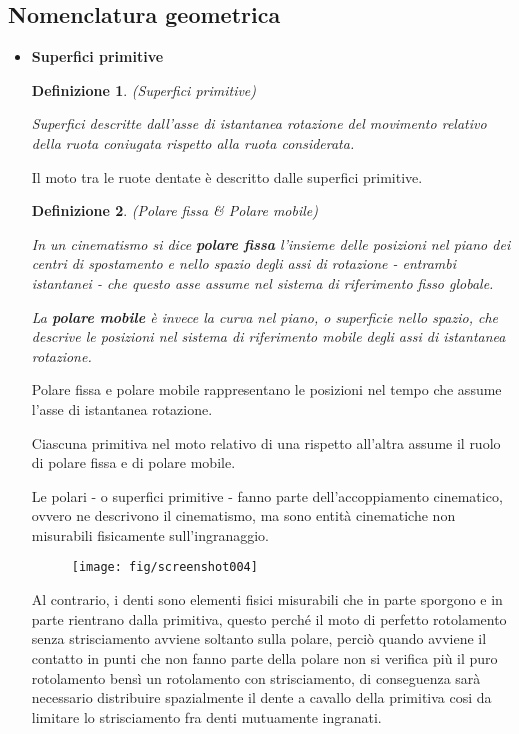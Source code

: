 \documentclass[a4paper, 15pt]{article}
\newtheorem*{deff}{Definizione}
\begin{document}
\subsection{Nomenclatura geometrica} 
\begin{adjustwidth}{2in}{}
	\begin{itemize}
		\item \textbf{Superfici primitive}
		
		\begin{deff} (Superfici primitive)
			
			Superfici descritte dall’asse di istantanea rotazione del movimento relativo della ruota coniugata rispetto alla ruota considerata.
		\end{deff} 
		Il moto tra le ruote dentate è descritto dalle superfici primitive. 
		
		\begin{deff} (Polare fissa \& Polare mobile)
			
			In un cinematismo si dice \textbf{polare fissa} l'insieme delle posizioni nel piano dei centri di spostamento e nello spazio degli assi di rotazione - entrambi istantanei - che questo asse assume nel sistema di riferimento fisso globale.
			
			La \textbf{polare mobile} è invece la curva nel piano, o superficie nello spazio, che descrive le posizioni nel sistema di riferimento mobile degli assi di istantanea rotazione.
		\end{deff}
		Polare fissa e polare mobile rappresentano le posizioni nel tempo che assume l'asse di istantanea rotazione. \newline
		
		Ciascuna primitiva nel moto relativo di una rispetto all'altra assume il ruolo di polare fissa e di polare mobile. \newline
		
		Le polari - o superfici primitive - fanno parte dell'accoppiamento cinematico, ovvero ne descrivono il cinematismo, ma sono entità cinematiche non misurabili fisicamente sull'ingranaggio.
		\begin{figure}[H]
			\centering
			\texttt{[image: fig/screenshot004]}
			\label{fig:screenshot004}
		\end{figure}
		Al contrario, i denti sono elementi fisici misurabili che in parte sporgono e in parte rientrano dalla primitiva, questo perché il moto di perfetto rotolamento senza strisciamento avviene soltanto sulla polare, perciò quando avviene il contatto in punti che non fanno parte della polare non si verifica più il puro rotolamento bensì un rotolamento con strisciamento, di conseguenza sarà necessario distribuire spazialmente il dente a cavallo della primitiva cosi da limitare lo strisciamento fra denti mutuamente ingranati.
		

\end{itemize}
\end{adjustwidth}
\end{document}
